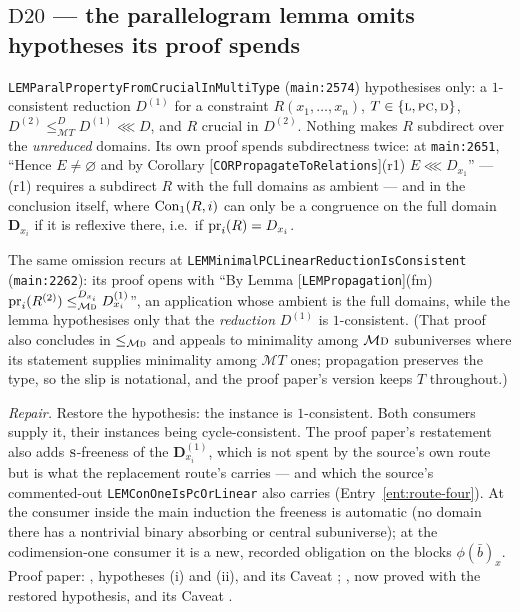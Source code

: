 \subsection{$\mathrm D{20}$ --- the parallelogram lemma omits hypotheses its
  proof spends}\label{sec:D20}

\texttt{LEMParalPropertyFromCrucialInMultiType} (\texttt{main:2574})
hypothesises only: a $1$-consistent reduction $D^{(1)}$ for a constraint
$R(x_{1},\dots,x_{n})$, $T\in\{\textup{\textsc{l}},\textup{\textsc{pc}},\textup{\textsc{d}}\}$, $D^{(2)}\le_{\mathcal
MT}^{D}D^{(1)}\lll D$, and $R$ crucial in $D^{(2)}$. Nothing makes $R$
subdirect over the \emph{unreduced} domains. Its own proof spends
subdirectness twice: at \texttt{main:2651}, ``Hence $E\neq\varnothing$ and
by Corollary [\texttt{CORPropagateToRelations}](r1) $E\lll D_{x_1}$'' ---
(r1) requires a subdirect $R$ with the full domains as ambient --- and in
the conclusion itself, where $\operatorname{Con}_1(R,i)$ can only be a congruence on the
full domain $\mathbf D_{x_{i}}$ if it is reflexive there, i.e.\ if
$\operatorname*{pr}_{i}(R)=D_{x_{i}}$.

The same omission recurs at
\texttt{LEMMinimalPCLinearReductionIsConsistent} (\texttt{main:2262}): its
proof opens with ``By Lemma [\texttt{LEMPropagation}](fm)
$\operatorname*{pr}_{i}(R^{(2)})\le_{\mathcal M\textup{\textsc{d}}}^{D_{x_{i}}}D_{x_{i}}^{(1)}$'', an application
whose ambient is the full domains, while the lemma hypothesises only that
the \emph{reduction} $D^{(1)}$ is $1$-consistent. (That proof also
concludes in $\le_{\mathcal M\textup{\textsc{d}}}$ and appeals to minimality among $\mathcal M\textup{\textsc{d}}$
subuniverses where its statement supplies minimality among
$\mathcal{M}T$ ones; propagation preserves the type, so the slip is
notational, and the proof paper's version keeps $T$ throughout.)

\emph{Repair.} Restore the hypothesis: the instance is
$1$-consistent. Both consumers supply it, their instances being
cycle-consistent. The proof paper's restatement also adds $\textup{\textsc{s}}$-freeness of
the $\mathbf D^{(1)}_{x_{i}}$, which is not spent by the source's own route
but is what the replacement route's  carries --- and
which the source's commented-out \texttt{LEMConOneIsPcOrLinear} also
carries (Entry~\ref{ent:route-four}). At the consumer inside the main
induction the freeness is automatic (no domain there has a nontrivial
binary absorbing or central subuniverse); at the codimension-one consumer
it is a new, recorded obligation on the blocks $\phi(\bar b)_{x}$. Proof
paper: , hypotheses (i) and (ii), and its
Caveat ; , now
proved with the restored hypothesis, and its Caveat
.

